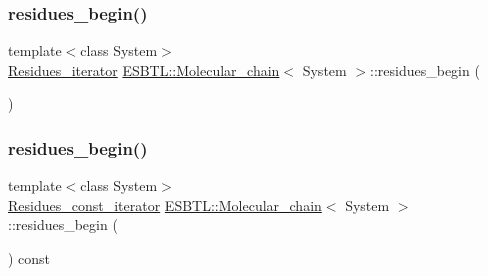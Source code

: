 \mbox{\label{group__grp__iters_ga5785a87f04fb8ffefaaf46c6f341b05d}} 
\subsubsection{\texorpdfstring{residues\+\_\+begin()}{residues\_begin()}\hspace{0.1cm}{\footnotesize\ttfamily [3/4]}}
{\footnotesize\ttfamily template$<$class System$>$ \\
\hyperlink{group__grp__iters_gaccad04117ad7c730e41bdb9aeab8f116}{Residues\+\_\+iterator} \hyperlink{classESBTL_1_1Molecular__chain}{E\+S\+B\+T\+L\+::\+Molecular\+\_\+chain}$<$ System $>$\+::residues\+\_\+begin (\begin{DoxyParamCaption}{ }\end{DoxyParamCaption})\hspace{0.3cm}{\ttfamily [inline]}}

\mbox{\label{group__grp__iters_ga7638b8fd914f2fb1895cfd02c79b1e5d}} 
\subsubsection{\texorpdfstring{residues\+\_\+begin()}{residues\_begin()}\hspace{0.1cm}{\footnotesize\ttfamily [4/4]}}
{\footnotesize\ttfamily template$<$class System$>$ \\
\hyperlink{group__grp__iters_ga4cadd9ac293bcd967a86f97bfc626a7f}{Residues\+\_\+const\+\_\+iterator} \hyperlink{classESBTL_1_1Molecular__chain}{E\+S\+B\+T\+L\+::\+Molecular\+\_\+chain}$<$ System $>$\+::residues\+\_\+begin (\begin{DoxyParamCaption}{ }\end{DoxyParamCaption}) const\hspace{0.3cm}{\ttfamily [inline]}}

\mbox{\label{group__grp__iters_ga25b33f03211c67afab9abf005d2ceaa1}} 
